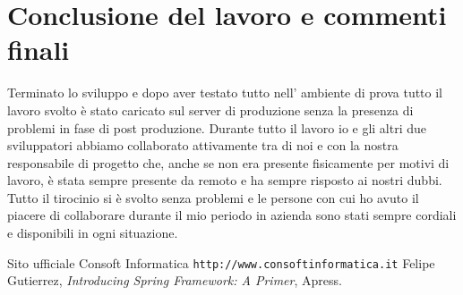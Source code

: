 \documentclass[12pt]{book}
\begin{document}
\chapter{Conclusione del lavoro e commenti finali}
Terminato lo sviluppo e dopo aver testato tutto nell' ambiente di prova tutto 
il lavoro svolto è stato caricato sul server di produzione senza la presenza
di problemi in fase di post produzione.
Durante tutto il lavoro io e gli altri due sviluppatori abbiamo collaborato 
attivamente tra di noi e con la nostra responsabile di progetto che, anche
se non era presente fisicamente per motivi di lavoro, è stata sempre presente
da remoto e ha sempre risposto ai nostri dubbi.
Tutto il tirocinio si è svolto senza problemi e le persone con cui ho avuto 
il piacere di collaborare durante il mio periodo in azienda sono stati sempre
cordiali e disponibili in ogni situazione.
\begin{thebibliography}{9}
     Sito ufficiale Consoft Informatica \newline
    \texttt{http://www.consoftinformatica.it}
    Felipe Gutierrez, 
    \emph{Introducing Spring Framework: A Primer}, Apress.
    \newline
\end{thebibliography}
\end{document}
